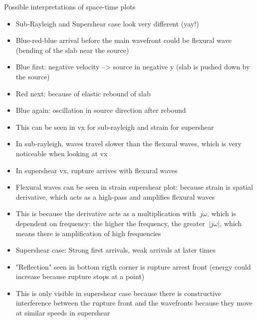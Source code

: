 \documentclass[11pt,aspectratio=169]{beamer}
\begin{document}
\begin{frame}[allowframebreaks]{Possible interpretations of space-time plots}
    \begin{itemize}
        \item Sub-Rayleigh and Supershear case look very different (yay!)
        \item Blue-red-blue arrival before the main wavefront could be flexural wave (bending of the slab near the source)
        \item Blue first: negative velocity --> source in negative y (slab is pushed down by the source)
        \item Red next: because of elastic rebound of slab 
        \item Blue again: oscillation in source direction after rebound
        \item This can be seen in vx for sub-rayleigh and strain for supershear
        \item In sub-rayleigh, waves travel slower than the flexural waves, which is very noticeable when looking at vx
        \item In supershear vx, rupture arrives with flexural waves 
        \item Flexural waves can be seen in strain supershear plot: because strain is spatial derivative, which acts as a high-pass and amplifies flexural waves 
        \item This is because the derivative acts as a multiplication with $ \ j\omega $, which is dependent on frequency: the higher the frequency, the greater $ \ |j\omega| $, which means there is amplification of high frequencies \parencite{oppenheimSignalsSystems1997}
        \item Supershear case: Strong first arrivals, weak arrivals at later times
        \item "Reflection" seen in bottom rigth corner is rupture arrest front (energy could increase because rupture stops at a point)
        \item This is only visible in supershear case because there is constructive interference between the rupture front and the wavefronts because they move at similar speeds in supershear
    \end{itemize}
    
\end{frame}
\end{document}
